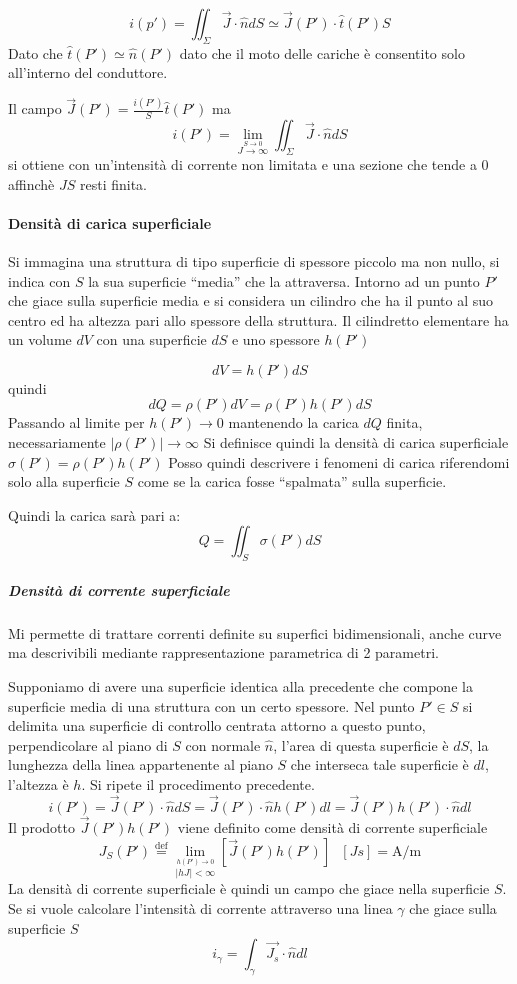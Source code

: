 $$
i(p') = \iint_\Sigma \vec{J}\cdot\hat{n}dS \simeq \vec{J}(P')\cdot\hat{t}(P')S
$$
Dato che $\hat{t}(P') \simeq \hat{n}(P')$ dato che il moto delle cariche è consentito solo 
all'interno del conduttore.

Il campo $\vec{J}(P') = \frac{i(P')}{S}\hat{t}(P')$ ma
$$
i(P') = \lim_{\stackrel{S\to 0}{J\to\infty}} \iint_\Sigma \vec{J}\cdot\hat{n}dS
$$
si ottiene con un'intensità di corrente non limitata e una sezione che tende a 0 affinchè $JS$ 
resti finita.

\paragraph{Densità di carica superficiale}
Si immagina una struttura di tipo superficie di spessore piccolo ma non nullo, si indica con $S$ la
sua superficie ``media'' che la attraversa.
Intorno ad un punto $P'$ che giace sulla superficie media e si considera un cilindro che ha il
punto al suo centro ed ha altezza pari allo spessore della struttura.
Il cilindretto elementare ha un volume $dV$ con una superficie $dS$ e uno spessore $h(P')$

$$
dV = h(P') dS
$$
quindi
$$
dQ = \rho(P')dV = \rho(P')h(P')dS
$$
Passando al limite per $h(P') \to 0$ mantenendo la carica $dQ$ finita, necessariamente
$|\rho(P')| \to \infty$
Si definisce quindi la densità di carica superficiale $\sigma(P') = \rho(P')h(P')$
Posso quindi descrivere i fenomeni di carica riferendomi solo alla superficie $S$
come se la carica fosse ``spalmata'' sulla superficie.

Quindi la carica sarà pari a:
$$
Q = \iint_S \sigma(P')dS
$$

\subparagraph{Densità di corrente superficiale}
Mi permette di trattare correnti definite su superfici bidimensionali, anche curve ma descrivibili
mediante rappresentazione parametrica di 2 parametri.

Supponiamo di avere una superficie identica alla precedente che compone la superficie media
di una struttura con un certo spessore. Nel punto $P' \in S$ si delimita una superficie di controllo
centrata attorno a questo punto, perpendicolare al piano di $S$ con normale $\hat{n}$, l'area
di questa superficie è $dS$, la lunghezza della linea appartenente al piano $S$ che interseca tale
superficie è $dl$, l'altezza è $h$. Si ripete il procedimento precedente.
$$
i(P') = \vec{J}(P')\cdot\hat{n}dS = \vec{J}(P')\cdot\hat{n}h(P')dl = \vec{J}(P')h(P')\cdot\hat{n}dl
$$
Il prodotto $\vec{J}(P')h(P')$ viene definito come densità di corrente superficiale 
$$
J_S(P')\stackrel{\text{def}}{=}\lim_{\stackrel{h(P')\to0}{|hJ|<\infty}} [\vec{J}(P')h(P')]\ \ \ [Js] = \si{\ampere/\meter}
$$
La densità di corrente superficiale è quindi un campo che giace nella superficie $S$.
Se si vuole calcolare l'intensità di corrente attraverso una linea $\gamma$ che giace 
sulla superficie $S$
$$
i_\gamma = \int_\gamma \vec{J_s}\cdot \hat{n} dl
$$
\newpage
